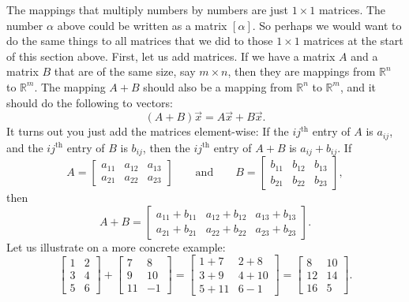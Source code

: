 The mappings that multiply numbers by numbers are just $1 \times 1$ matrices.  The
number $\alpha$ above could be written as a matrix $[\alpha]$.
So perhaps we would want to do the same things to all matrices that we
did to those $1 \times 1$ matrices at the start of this section above.
First, let us add matrices.
If we have a matrix $A$ and a matrix $B$ that are of the same size,
say $m \times n$, then they are mappings from
${\mathbb{R}}^n$ to ${\mathbb{R}}^m$.  The mapping $A+B$ should also be a mapping from
${\mathbb{R}}^n$ to ${\mathbb{R}}^m$, and it should do the following to
vectors:
\begin{equation*}
(A+B) \vec{x} = A\vec{x} + B \vec{x} .
\end{equation*}
It turns out you just add the matrices element-wise:  If the
$ij^{\text{th}}$ entry of $A$ is $a_{ij}$, and the
$ij^{\text{th}}$ entry of $B$ is $b_{ij}$, then the
$ij^{\text{th}}$ entry of $A+B$ is $a_{ij} + b_{ij}$.  If
\begin{equation*}
A = 
\begin{bmatrix}
a_{11} & a_{12} & a_{13}  \\
a_{21} & a_{22} & a_{23}
\end{bmatrix}
\qquad \text{and} \qquad
B = 
\begin{bmatrix}
b_{11} & b_{12} & b_{13}  \\
b_{21} & b_{22} & b_{23}
\end{bmatrix} ,
\end{equation*}
then
\begin{equation*}
A+B = 
\begin{bmatrix}
a_{11} + b_{11} & a_{12} + b_{12} & a_{13} + b_{13}  \\
a_{21} + b_{21} & a_{22} + b_{22} & a_{23} + b_{23}
\end{bmatrix} .
\end{equation*}
Let us illustrate on a more concrete example:
\begin{equation*}
\begin{bmatrix}
1 & 2 \\
3 & 4 \\
5 & 6
\end{bmatrix}
+
\begin{bmatrix}
7 & 8 \\
9 & 10 \\
11 & -1
\end{bmatrix}
=
\begin{bmatrix}
1+7 & 2+8 \\
3+9 & 4+10 \\
5+11 & 6-1
\end{bmatrix}
=
\begin{bmatrix}
8 & 10 \\
12 & 14 \\
16 & 5
\end{bmatrix} .
\end{equation*}
